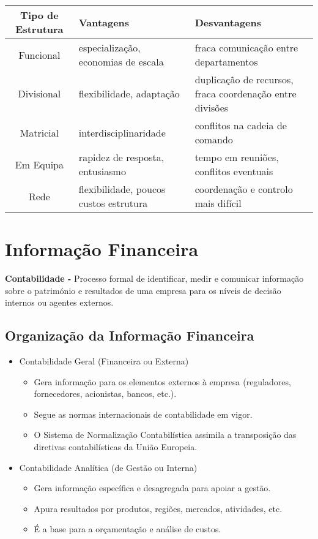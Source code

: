 \documentclass[11pt]{article}
\begin{document}
\begin{tabular}[t]{ | c | p{100pt} | p{150pt} | }
    \hline
    Tipo de Estrutura & Vantagens & Desvantagens \\\hline
    Funcional & especialização, economias de escala & fraca comunicação entre departamentos \\\hline
    Divisional & flexibilidade, adaptação & duplicação de recursos, fraca coordenação entre divisões \\\hline
    Matricial & interdisciplinaridade & conflitos na cadeia de comando \\\hline
    Em Equipa & rapidez de resposta, entusiasmo & tempo em reuniões, conflitos eventuais \\\hline
    Rede & flexibilidade, poucos custos estrutura & coordenação e controlo mais difícil \\\hline
\end{tabular}

\newpage

\section{Informação Financeira}

\textbf{Contabilidade -} Processo formal de identificar, medir e comunicar informação sobre o património e resultados de uma empresa para os níveis de decisão internos ou agentes externos.

\subsection{Organização da Informação Financeira}

\begin{itemize}
    \item Contabilidade Geral (Financeira ou Externa)
    \begin{itemize}
        \item Gera informação para os elementos externos à empresa         (reguladores, fornecedores, acionistas, bancos, etc.).
        \item Segue as normas internacionais de contabilidade em vigor.
        \item O Sistema de Normalização Contabilística assimila a
        transposição das diretivas contabilísticas da União Europeia.
    \end{itemize}
    \item Contabilidade Analítica (de Gestão ou Interna)
    \begin{itemize}
        \item Gera informação específica e desagregada para apoiar a gestão.
        \item Apura resultados por produtos, regiões, mercados, atividades, etc.
        \item É a base para a orçamentação e análise de custos.
    \end{itemize}
\end{itemize}
\end{document}
